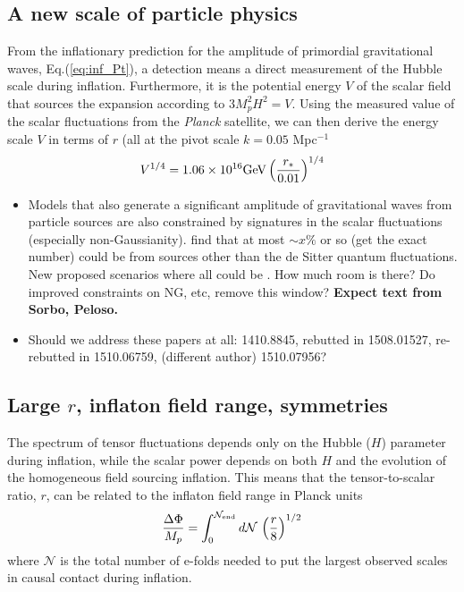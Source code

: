 \subsection{A new scale of particle physics}
\label{sec:scale-of-inflation}
From the inflationary prediction for the amplitude of primordial gravitational waves, Eq.(\ref{eq:inf_Pt}), a detection means a direct measurement of the Hubble scale during inflation. Furthermore, it is the potential energy $V$ of the scalar field that sources the expansion according to $3M_p^2H^2=V$. Using the measured value of the scalar fluctuations from the {\it Planck} satellite, we can then derive the energy scale $V$ in terms of $r$ (all at the pivot scale $k=0.05$ Mpc$^{-1}$
\begin{equation}
V^{1/4}=1.06\times 10^{16}{\rm GeV}\left(\frac{r_*}{0.01}\right)^{1/4}
\end{equation}



\begin{itemize}
\item Models that also generate a significant amplitude of gravitational waves from particle sources are also constrained by signatures in the scalar fluctuations (especially non-Gaussianity). \cite{Mirbabayi:2014jqa, Ozsoy:2014sba} find that at most $\sim x\%$ or so (get the exact number) could be from sources other than the de Sitter quantum fluctuations. New proposed scenarios where all could be  \cite{Namba:2015gja}. How much room is there? Do improved constraints on NG, etc, remove this window? {\bf Expect text from Sorbo, Peloso.}
\item Should we address these papers at all: 1410.8845, rebutted in 1508.01527, re-rebutted in 1510.06759, (different author) 1510.07956?
\end{itemize}

\subsection{Large $r$, inflaton field range, symmetries}
The spectrum of tensor fluctuations depends only on the Hubble ($H$) parameter during inflation, while the scalar power depends on both $H$ and the evolution of the homogeneous field sourcing inflation. This means that the tensor-to-scalar ratio, $r$, can be related to the inflaton field range in Planck units \cite{Lyth:1996im}
\begin{equation}
\label{eq:Lyth}
\frac{\Delta\Phi}{M_p}=\int_0^{\mathcal{N}_{\rm end}}d\mathcal{N}\,\left(\frac{r}{8}\right)^{1/2}
\end{equation}
where $\mathcal{N}$ is the total number of e-folds needed to put the largest observed scales in causal contact during inflation.

